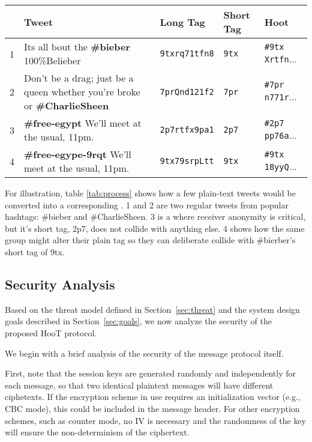 \begin{table*}
\caption{\hoot Process
\label{tab:process}
}
\begin{center}
    \begin{tabular}{ l  l  l  l  l }
	\hline
	 & Tweet & Long Tag & Short Tag & Hoot \\ \hline
	1 & Its all bout the {\bf \#bieber} 100\%Belieber                                 & {\tt 9txrq71tfn8} &  {\tt 9tx} & {\tt \#9tx Xrtfn}... \\
	2 & Don't be a drag; just be a queen whether you're broke or {\bf \#CharlieSheen} & {\tt 7prQnd121f2} & {\tt 7pr} & {\tt \#7pr n771r}... \\
	3 & {\bf \#free-egypt} We'll meet at the usual, 11pm.                             & {\tt 2p7rtfx9pa1} & {\tt 2p7} & {\tt \#2p7 pp76a}... \\
	4 & {\bf \#free-egype-9rqt} We'll meet at the usual, 11pm.                        & {\tt 9tx79srpLtt} &  {\tt 9tx}  & {\tt \#9tx 18yyQ}... \\
    \end{tabular}
\end{center}
\end{table*}

For illustration, table \ref{tab:process} shows how a few plain-text tweets would be converted into a corresponding \hoot. 1 and 2 are two regular tweets from popular hashtags: \#bieber and \#CharlieSheen. 3 is a \hoot where receiver anonymity is critical, but it's short tag, 2p7, does not collide with anything else. 4 shows how the same group might alter their plain tag so they can deliberate collide with \#bierber's short tag of 9tx.


\subsection{Security Analysis}
\label{sec:security}

Based on the threat model defined in Section~\ref{sec:threat} and the
system design goals described in Section~\ref{sec:goals}, we now analyze
the security of the proposed HooT protocol.

%
We begin with a brief analysis of the security of the message protocol
itself.

First, note that the session keys are generated randomly and
independently for each message, so that two identical plaintext messages
will have different ciphetexts. If the encryption scheme in use requires
an initialization vector (e.g., CBC mode), this could be included in the
message header. For other encryption schemes, such as counter mode, no
IV is necessary and the randomness of the key will ensure the
non-determinism of the ciphertext.

